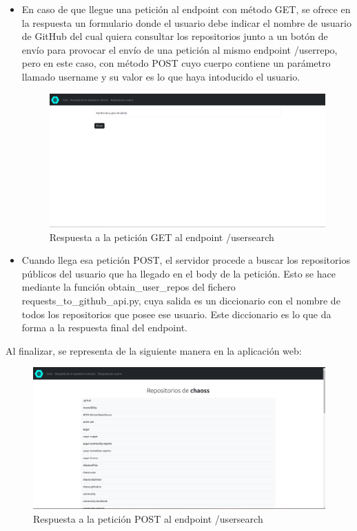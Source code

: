 \documentclass[a4paper, 12pt]{book}
\begin{document}
\begin{itemize}
  \item En caso de que llegue una petición al endpoint con método GET, se ofrece en la respuesta un formulario donde el usuario debe indicar el nombre de usuario de GitHub del cual quiera consultar los repositorios junto a un botón de envío para provocar el envío de una petición al mismo endpoint /userrepo, pero en este caso, con método POST cuyo cuerpo contiene un parámetro llamado username y su valor es lo que haya intoducido el usuario.
    \begin{figure}[H]
      \centering
      \includegraphics[width=1\textwidth]{img/usersearchget.png}
      \caption{Respuesta a la petición GET al endpoint /usersearch}
      \label{figura:usersearch}
    \end{figure}
  \item Cuando llega esa petición POST, el servidor procede a buscar los repositorios públicos del usuario que ha llegado en el body de la petición. Esto se hace mediante la función obtain\_user\_repos del fichero requests\_to\_github\_api.py, cuya salida es un diccionario con el nombre de todos los repositorios que posee ese usuario. Este diccionario es lo que da forma a la respuesta final del endpoint.
\end{itemize}

Al finalizar, se representa de la siguiente manera en la aplicación web:


\begin{figure}[H]
  \centering
  \includegraphics[width=1\textwidth]{img/usersearchpost.png}
  \caption{Respuesta a la petición POST al endpoint /usersearch}
  \label{figura:resultusersearch}
\end{figure}
\end{document}
